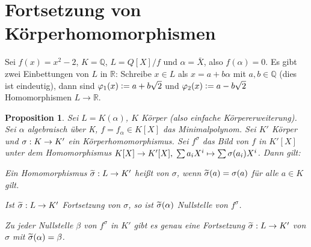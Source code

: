 \documentclass[a4paper,10pt,german]{scrbook}
\theoremstyle{saetze}
\theoremstyle{definitionen}
\newtheorem{Prop}[Def]{Proposition}
\begin{document}
\section{Fortsetzung von Körperhomomorphismen}

Sei $f(x)=x^2-2$, $K=\mathbb Q$, $L=Q[X]/f$ und $\alpha=\bar X$, also $f(\alpha)=0$. Es gibt zwei Einbettungen von $L$ in $\mathbb R$: Schreibe $x\in L$ als $x=a + b\alpha$ mit $a,b\in \mathbb Q$ (dies ist eindeutig), dann sind $\varphi_1(x)\mathrel{\mathop:}= a+ b\sqrt 2$ und $\varphi_2(x)\mathrel{\mathop:}= a-b\sqrt 2$ Homomorphismen $L\to \mathbb R$.

\begin{Prop}
\label{3.8}
Sei $L = K(\alpha)$, $K$ Körper (also einfache Körpererweiterung).
Sei $\alpha$ algebraisch über K, $f = f_\alpha \in K[X]$ das Minimalpolynom.
Sei $K'$ Körper und $\sigma: K \rightarrow K'$ ein Körperhomomorphismus. Sei
$f^\sigma$ das Bild von $f$ in $K'[X]$ unter dem Homomorphismus
$K[X] \rightarrow K'[X], \;\sum a_i X^i \mapsto \sum \sigma(a_i) X^i$. Dann
gilt:

\begin{enum}
\item Ein Homomorphismus $\widetilde\sigma:L\to K'$ heißt  von $\sigma$, wenn $\widetilde\sigma(a)=\sigma(a)$ für alle $a\in K$ gilt.
\item Ist $\widetilde{\sigma}: L\rightarrow K'$ Fortsetzung von $\sigma$, so ist $\widetilde{\sigma}(\alpha)$ Nullstelle von $f^\sigma$.
\item Zu jeder Nullstelle $\beta$ von $f^\sigma$ in $K'$ gibt es
genau eine Fortsetzung $\widetilde{\sigma}:L \rightarrow K'$ von $\sigma$ mit
$\widetilde{\sigma}(\alpha) = \beta$.

\end{enum}

\end{Prop}
\end{document}
